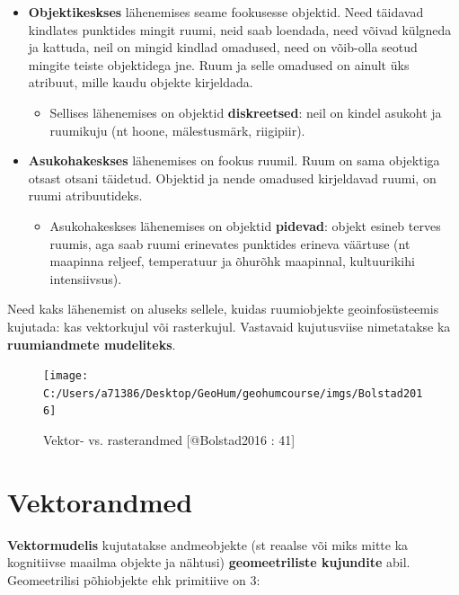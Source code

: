 \documentclass[
]{book}
\providecommand{\tightlist}{%
  \setlength{\itemsep}{0pt}\setlength{\parskip}{0pt}}
\begin{document}
\begin{itemize}
\tightlist
\item
  \textbf{Objektikeskses} lähenemises seame fookusesse objektid. Need täidavad kindlates punktides mingit ruumi, neid saab loendada, need võivad külgneda ja kattuda, neil on mingid kindlad omadused, need on võib-olla seotud mingite teiste objektidega jne. Ruum ja selle omadused on ainult üks atribuut, mille kaudu objekte kirjeldada.

  \begin{itemize}
  \tightlist
  \item
    Sellises lähenemises on objektid \textbf{diskreetsed}: neil on kindel asukoht ja ruumikuju (nt hoone, mälestusmärk, riigipiir).\\
  \end{itemize}
\item
  \textbf{Asukohakeskses} lähenemises on fookus ruumil. Ruum on sama objektiga otsast otsani täidetud. Objektid ja nende omadused kirjeldavad ruumi, on ruumi atribuutideks.

  \begin{itemize}
  \tightlist
  \item
    Asukohakeskses lähenemises on objektid \textbf{pidevad}: objekt esineb terves ruumis, aga saab ruumi erinevates punktides erineva väärtuse (nt maapinna reljeef, temperatuur ja õhurõhk maapinnal, kultuurikihi intensiivsus).
  \end{itemize}
\end{itemize}

Need kaks lähenemist on aluseks sellele, kuidas ruumiobjekte geoinfosüsteemis kujutada: kas vektorkujul või rasterkujul. Vastavaid kujutusviise nimetatakse ka \textbf{ruumiandmete mudeliteks}.

\begin{figure}

{\centering \texttt{[image: C:/Users/a71386/Desktop/GeoHum/geohumcourse/imgs/Bolstad2016]} 

}

\caption{Vektor- vs. rasterandmed [@Bolstad2016 : 41]}\label{fig:data-models}
\end{figure}

\hypertarget{vektorandmed}{%
\section{Vektorandmed}\label{vektorandmed}}

\textbf{Vektormudelis} kujutatakse andmeobjekte (st reaalse või miks mitte ka kognitiivse maailma objekte ja nähtusi) \textbf{geomeetriliste kujundite} abil.
Geomeetrilisi põhiobjekte ehk primitiive on 3:
\end{document}

